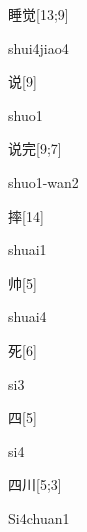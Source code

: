 \begin{verbete}{睡觉}[13;9]
\begin{pronuncia}{shui4jiao4}
\end{pronuncia}
\end{verbete}

\begin{verbete}[shuo1]{说}[9]
\begin{pronuncia}{shuo1}
\end{pronuncia}
\end{verbete}

\begin{verbete}{说完}[9;7]
\begin{pronuncia}{shuo1-wan2}
\end{pronuncia}
\end{verbete}

\begin{verbete}[shuai1]{摔}[14]
\begin{pronuncia}{shuai1}
\end{pronuncia}
\end{verbete}

\begin{verbete}[shuai4]{帅}[5]
\begin{pronuncia}{shuai4}
\end{pronuncia}
\end{verbete}

\begin{verbete}[si3]{死}[6]
\begin{pronuncia}{si3}
\end{pronuncia}
\end{verbete}

\begin{verbete}[si4]{四}[5]
\begin{pronuncia}{si4}
\end{pronuncia}
\end{verbete}

\begin{verbete}[Si4chuan1]{四川}[5;3]
\begin{pronuncia}{Si4chuan1}
\end{pronuncia}
\end{verbete}

